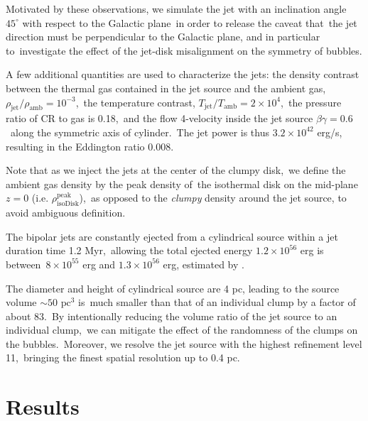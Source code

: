 \documentclass[twocolumn]{aastex631}
\begin{document}
  Motivated by these observations, we simulate the jet with an inclination angle\
  $45^{\circ}$ with respect to the Galactic plane\
  in order to release the caveat that\
  the jet direction must be perpendicular to the Galactic plane, and in particular to\
  investigate the effect of the jet-disk misalignment on the symmetry of bubbles.


  A few additional quantities are used to characterize the jets:
  the density contrast between the thermal gas contained in the jet source and the ambient gas,\
  $\rho_{\text{jet}}/\rho_{\text{amb}}=10^{-3}$,\
  the temperature contrast, $T_{\text{jet}}/T_{\text{amb}}=2\times10^{4}$,\
  the pressure ratio of CR to gas is 0.18,\
  and the flow 4-velocity inside the jet source $\beta\gamma = 0.6$\
  along the symmetric axis of cylinder.\
  The jet power is thus $3.2\times 10^{42}$ erg/s, resulting in the Eddington ratio 0.008.

  Note that as we inject the jets at the center of the clumpy disk,\
  we define the ambient gas density by the peak density of\
  the isothermal disk on the mid-plane $z=0$ (i.e. $\rho^{\text{peak}}_{\text{isoDisk}}$),\
  as opposed to the \textit{clumpy} density around the jet source, to avoid ambiguous definition.


  The bipolar jets are constantly ejected from a cylindrical source within a jet duration time 1.2 Myr,\
  allowing the total ejected energy $1.2\times10^{56}$ erg is between\
  $8\times10^{55}$ erg and $1.3\times10^{56}$ erg, estimated by \citet{Predehl2020}.\


  The diameter and height of cylindrical source are 4 pc, leading to the source volume $\sim 50 \text{ pc}^{3}$ is\
  much smaller than that of an individual clump by a factor of about 83.\
  By intentionally reducing the volume ratio of the jet source to an individual clump,\
  we can mitigate the effect of the randomness of the clumps on the bubbles.\
  Moreover, we resolve the jet source with the highest refinement level 11,\
  bringing the finest spatial resolution up to 0.4 pc.\



\section{Results}
\end{document}
